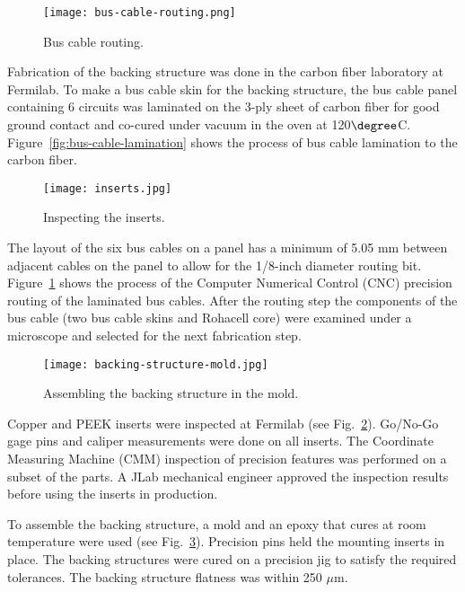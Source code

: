 \begin{figure}[hbt] 
\centering 
\texttt{[image: bus-cable-routing.png]}
\caption{Bus cable routing.}
\label{fig:bus-cable-routing}
\end{figure}

Fabrication of the backing structure was done in the carbon fiber laboratory at Fermilab. To make a bus cable skin for the backing structure, the bus cable panel containing 6 circuits was laminated on the 3-ply sheet of carbon fiber for good ground contact and co-cured under vacuum in the oven at 120$\degree$C. Figure~\ref{fig:bus-cable-lamination} shows the process of bus cable lamination to the carbon fiber.

\begin{figure}[hbt] 
\centering 
\texttt{[image: inserts.jpg]}
\caption{Inspecting the inserts.}
\label{fig:inserts}
\end{figure}

The layout of the six bus cables on a panel has a minimum of 5.05 mm between adjacent cables on the panel to allow for the 1/8-inch diameter routing bit. Figure~\ref{fig:bus-cable-routing} shows the process of the Computer Numerical Control (CNC) precision routing of the laminated bus cables. After the routing step the components of the bus cable (two bus cable skins and Rohacell core) were examined under a microscope and selected for the next fabrication step. 

\begin{figure}[hbt] 
\centering 
\texttt{[image: backing-structure-mold.jpg]}
\caption{Assembling the backing structure in the mold.}
\label{fig:backing-structure-mold}
\end{figure}

Copper and PEEK inserts were inspected at Fermilab (see Fig.~\ref{fig:inserts}). Go/No-Go gage pins and caliper measurements were done on all inserts. The Coordinate Measuring Machine (CMM) inspection of precision features was performed on a subset of the parts. A JLab mechanical engineer approved the inspection results before using the inserts in production.

To assemble the backing structure, a mold and an epoxy that cures at room temperature were used (see Fig.~\ref{fig:backing-structure-mold}). Precision pins held the mounting inserts in place. The backing structures were cured on a precision jig to satisfy the required tolerances. The backing structure flatness was within 250 $\mu$m.

